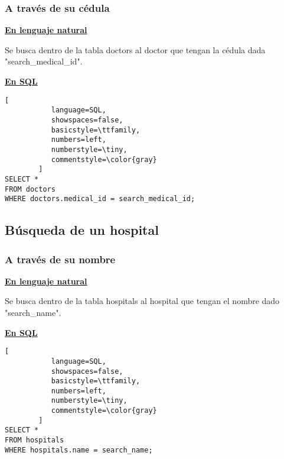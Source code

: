 \subsubsection{A través de su cédula}

\textbf{\underline{En lenguaje natural}}

\vspace{0.3 cm}

Se busca dentro de la tabla doctors al doctor que tengan la cédula dada "search_medical_id".

\vspace{0.3 cm}

\textbf{\underline{En SQL}}

\vspace{0.3 cm}

\begin{lstlisting}[
           language=SQL,
           showspaces=false,
           basicstyle=\ttfamily,
           numbers=left,
           numberstyle=\tiny,
           commentstyle=\color{gray}
        ]
SELECT * 
FROM doctors
WHERE doctors.medical_id = search_medical_id;
\end{lstlisting}

\subsection{Búsqueda de un hospital}

\subsubsection{A través de su nombre}

\textbf{\underline{En lenguaje natural}}

\vspace{0.3 cm}

Se busca dentro de la tabla hospitals al hospital que tengan el nombre dado "search_name".

\vspace{0.3 cm}

\textbf{\underline{En SQL}}

\vspace{0.3 cm}

\begin{lstlisting}[
           language=SQL,
           showspaces=false,
           basicstyle=\ttfamily,
           numbers=left,
           numberstyle=\tiny,
           commentstyle=\color{gray}
        ]
SELECT * 
FROM hospitals
WHERE hospitals.name = search_name;
\end{lstlisting}

